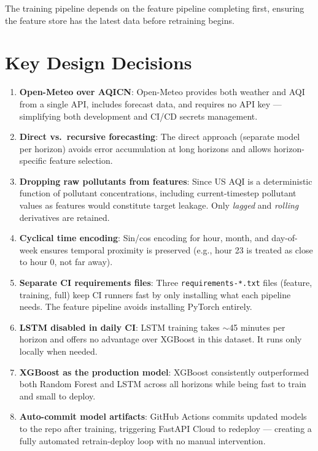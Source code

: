 \documentclass[12pt, a4paper]{article}
\begin{document}
The training pipeline depends on the feature pipeline completing first, ensuring the feature store has the latest data before retraining begins.


\section{Key Design Decisions}

\begin{enumerate}[label=\textbf{\arabic*.}]
  \item \textbf{Open-Meteo over AQICN}: Open-Meteo provides both weather and AQI from a single API, includes forecast data, and requires no API key --- simplifying both development and CI/CD secrets management.

  \item \textbf{Direct vs.\ recursive forecasting}: The direct approach (separate model per horizon) avoids error accumulation at long horizons and allows horizon-specific feature selection.

  \item \textbf{Dropping raw pollutants from features}: Since US AQI is a deterministic function of pollutant concentrations, including current-timestep pollutant values as features would constitute target leakage.  Only \emph{lagged} and \emph{rolling} derivatives are retained.

  \item \textbf{Cyclical time encoding}: Sin/cos encoding for hour, month, and day-of-week ensures temporal proximity is preserved (e.g., hour 23 is treated as close to hour 0, not far away).

  \item \textbf{Separate CI requirements files}: Three \texttt{requirements-*.txt} files (feature, training, full) keep CI runners fast by only installing what each pipeline needs.  The feature pipeline avoids installing PyTorch entirely.

  \item \textbf{LSTM disabled in daily CI}: LSTM training takes $\sim$45 minutes per horizon and offers no advantage over XGBoost in this dataset.  It runs only locally when needed.

  \item \textbf{XGBoost as the production model}: XGBoost consistently outperformed both Random Forest and LSTM across all horizons while being fast to train and small to deploy.

  \item \textbf{Auto-commit model artifacts}: GitHub Actions commits updated models to the repo after training, triggering FastAPI Cloud to redeploy --- creating a fully automated retrain-deploy loop with no manual intervention.
\end{enumerate}
\end{document}

